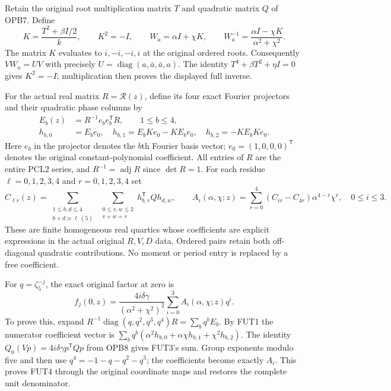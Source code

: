 \documentclass[11pt]{article}
\begin{document}
Retain the original root multiplication matrix $T$ and quadratic matrix
$Q$ of OPB7. Define
\[
 K=\frac{T^2+\beta I/2}{k},\qquad
 K^2=-I,\qquad
 W_a=\alpha I+\chi K,\qquad
 W_a^{-1}=\frac{\alpha I-\chi K}{\alpha^2+\chi^2}.
 \tag{FUT1}
\]
The matrix $K$ evaluates to $i,-i,-i,i$ at the original ordered roots.
Consequently $VW_a=UV$ with precisely
$U=\operatorname{diag}(a,\bar a,\bar a,a)$.
The identity $T^4+\beta T^2+\eta I=0$ gives $K^2=-I$;
multiplication then proves the displayed full inverse.

For the actual real matrix $R=\mathcal R(z)$, define its four exact
Fourier projectors and their quadratic phase columns by
\[
 \begin{split}
 E_b(z)&=R^{-1}e_be_b^{\mathsf T}R,\qquad 1\le b\le4,\\
 h_{b,0}&=E_be_0,\quad
 h_{b,1}=E_bKe_0-KE_be_0,\quad
 h_{b,2}=-KE_bKe_0.
 \end{split}\tag{FUT2}
\]
Here $e_b$ in the projector denotes the $b$th Fourier basis vector;
$e_0=(1,0,0,0)^{\mathsf T}$ denotes the original constant-polynomial
coefficient. All entries of $R$ are the entire PCL2 series, and
$R^{-1}=\operatorname{adj}R$ since $\det R=1$.
For each residue $\ell=0,1,2,3,4$ and $r=0,1,2,3,4$ set
\[
 C_{\ell r}(z)=
 \sum_{\substack{1\le b,d\le4\\b+d\equiv\ell\ (5)}}
 \ \sum_{\substack{0\le v,w\le2\\v+w=r}}
       h_{b,v}^{\mathsf T}Qh_{d,w},\qquad
 A_i(\alpha,\chi;z)=
 \sum_{r=0}^4(C_{ir}-C_{4r})\alpha^{4-r}\chi^r,
 \quad 0\le i\le3.
 \tag{FUT3}
\]
These are finite homogeneous real quartics whose coefficients are
explicit expressions in the actual original $R,V,D$ data. Ordered
pairs retain both off-diagonal quadratic contributions.
No moment or period entry is replaced by a free coefficient.

For $q=\zeta_5^{-j}$, the exact original factor at zero is
\[
 \boxed{\quad
 f_j(0,z)=\frac{4i\delta\gamma}{(\alpha^2+\chi^2)^2}
          \sum_{i=0}^3A_i(\alpha,\chi;z)q^i.
 \quad}\tag{FUT4}
\]
To prove this, expand
$R^{-1}\operatorname{diag}(q,q^2,q^3,q^4)R=\sum_bq^bE_b$.
By FUT1 the numerator coefficient vector is
$\sum_bq^b(\alpha^2h_{b,0}+\alpha\chi h_{b,1}+\chi^2h_{b,2})$.
The identity $Q_0(Vp)=4i\delta\gamma p^{\mathsf T}Qp$ from OPB8
gives FUT3's sum. Group exponents modulo five and then use
$q^4=-1-q-q^2-q^3$; the coefficients become exactly $A_i$.
This proves FUT4 through the original coordinate maps and restores
the complete unit denominator.
\end{document}
